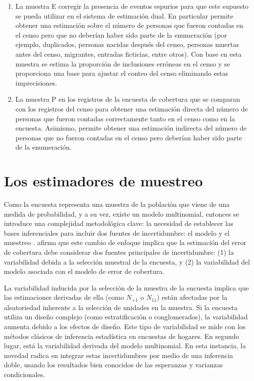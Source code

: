 \documentclass[
  12pt,
]{book}
\begin{document}
\begin{enumerate}
\def\labelenumi{\arabic{enumi}.}
\item
  La muestra E corregir la presencia de eventos espurios para que este supuesto se pueda utilizar en el sistema de estimación dual. En particular permite obtener una estimación sobre el número de personas que fueron contadas en el censo pero que no deberían haber sido parte de la enumeración (por ejemplo, duplicados, personas nacidas después del censo, personas muertas antes del censo, migrantes, entradas ficticias, entre otros). Con base en esta muestra se estima la proporción de inclusiones erróneas en el censo y se proporciona una base para ajustar el conteo del censo eliminando estas imprecisiones.
\item
  La muestra P en los registros de la encuesta de cobertura que se comparan con los registros del censo para obtener una estimación directa del número de personas que fueron contadas correctamente tanto en el censo como en la encuesta. Asimismo, permite obtener una estimación indirecta del número de personas que no fueron contadas en el censo pero deberían haber sido parte de la enumeración.
\end{enumerate}

\hypertarget{los-estimadores-de-muestreo}{%
\section{Los estimadores de muestreo}\label{los-estimadores-de-muestreo}}

Como la encuesta representa una muestra de la población que viene de una medida de probabilidad, y a su vez, existe un modelo multinomial, entonces se introduce una complejidad metodológica clave: la necesidad de establecer las bases inferenciales para incluir dos fuentes de incertidumbre: el modelo y el muestreo \citep{Binder_2011}. \citet{wolter1986coverage} afirma que este cambio de enfoque implica que la estimación del error de cobertura debe considerar dos fuentes principales de incertidumbre: (1) la variabilidad debida a la selección muestral de la encuesta, y (2) la variabilidad del modelo asociada con el modelo de error de cobertura.

La variabilidad inducida por la selección de la muestra de la encuesta implica que las estimaciones derivadas de ella (como \(N_{+1}\) o \(N_{11}\)) están afectadas por la aleatoriedad inherente a la selección de unidades en la muestra. Si la encuesta utiliza un diseño complejo (como estratificación o conglomerados), la variabilidad aumenta debido a los efectos de diseño. Este tipo de variabilidad se mide con los métodos clásicos de inferencia estadística en encuestas de hogares. En segundo lugar, está la variabilidad derivada del modelo multinomial. En esta instancia, la novedad radica en integrar estas incertidumbres por medio de una inferencia doble, usando los resultados bien conocidos de las esperanzas y varianzas condicionales.
\end{document}
